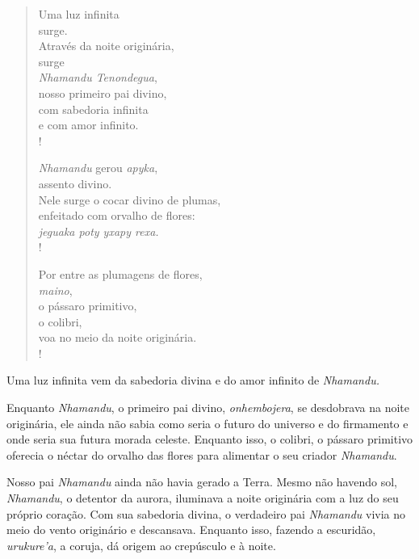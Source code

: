 
 

\begin{verse}
Uma luz infinita\\
surge.\\
Através da noite originária,\\
surge\\
\emph{Nhamandu Tenondegua},\\
nosso primeiro pai divino,\\
com sabedoria infinita\\
e com amor infinito.\\!
 

\emph{Nhamandu} gerou \emph{apyka},\\
assento divino.\\
Nele surge o cocar divino de plumas,\\
enfeitado com orvalho de flores:\\
\emph{jeguaka poty yxapy rexa.}\\!

Por entre as plumagens de flores,\\
\emph{maino},\\
o pássaro primitivo,\\
o colibri,\\
voa no meio da noite originária.\\!
\end{verse}


Uma luz infinita vem da sabedoria divina e do amor infinito
de \emph{Nhamandu.}

 

\asterisc{}


Enquanto \emph{Nhamandu}, o primeiro pai divino, \emph{onhembojera}, se
desdobrava na noite originária, ele ainda não sabia como seria o futuro
do universo e do firmamento e onde seria sua futura morada celeste.
Enquanto isso, o colibri, o pássaro primitivo oferecia o néctar do
orvalho das flores para alimentar o seu criador \emph{Nhamandu}.

Nosso pai \emph{Nhamandu} ainda não havia gerado a Terra. Mesmo não
havendo sol, \emph{Nhamandu}, o detentor da aurora, iluminava a noite
originária com a luz do seu próprio coração. Com sua sabedoria divina, o
verdadeiro pai \emph{Nhamandu} vivia no meio do vento originário e
descansava. Enquanto isso, fazendo a escuridão, \emph{urukure'a}, a
coruja, dá origem ao crepúsculo e à noite.

